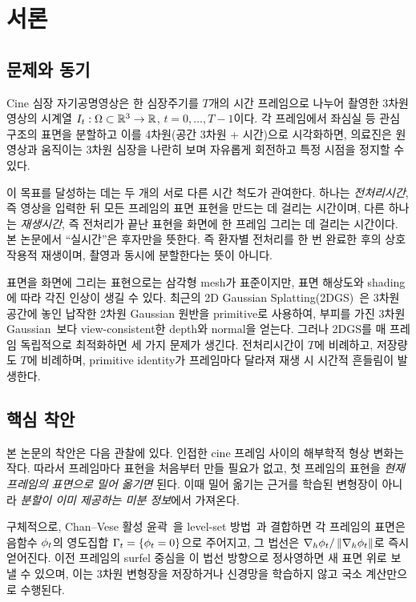 \chapter{서론}
\label{ch:intro}

\section{문제와 동기}

Cine 심장 자기공명영상은 한 심장주기를 $T$개의 시간 프레임으로 나누어 촬영한
3차원 영상의 시계열 $I_t:\Omega\subset\mathbb{R}^3\to\mathbb{R}$, $t=0,\dots,T-1$이다. 각
프레임에서 좌심실 등 관심 구조의 표면을 분할하고 이를 4차원(공간 3차원 + 시간)으로
시각화하면, 의료진은 원 영상과 움직이는 3차원 심장을 나란히 보며 자유롭게 회전하고
특정 시점을 정지할 수 있다.

이 목표를 달성하는 데는 두 개의 서로 다른 시간 척도가 관여한다. 하나는
\emph{전처리시간}, 즉 영상을 입력한 뒤 모든 프레임의 표면 표현을 만드는 데 걸리는
시간이며, 다른 하나는 \emph{재생시간}, 즉 전처리가 끝난 표현을 화면에 한 프레임
그리는 데 걸리는 시간이다. 본 논문에서 ``실시간''은 후자만을 뜻한다. 즉 환자별
전처리를 한 번 완료한 후의 상호작용적 재생이며, 촬영과 동시에 분할한다는 뜻이
아니다.

표면을 화면에 그리는 표현으로는 삼각형 mesh가 표준이지만, 표면 해상도와 shading에
따라 각진 인상이 생길 수 있다. 최근의 2D Gaussian Splatting(2DGS)~\citep{huang2024_2dgs}은
3차원 공간에 놓인 납작한 2차원 Gaussian 원반을 primitive로 사용하여, 부피를 가진
3차원 Gaussian~\citep{kerbl2023_3dgs}보다 view-consistent한 depth와 normal을 얻는다.
그러나 2DGS를 매 프레임 독립적으로 최적화하면 세 가지 문제가 생긴다. 전처리시간이
$T$에 비례하고, 저장량도 $T$에 비례하며, primitive identity가 프레임마다 달라져
재생 시 시간적 흔들림이 발생한다.

\section{핵심 착안}

본 논문의 착안은 다음 관찰에 있다. 인접한 cine 프레임 사이의 해부학적 형상 변화는
작다. 따라서 프레임마다 표현을 처음부터 만들 필요가 없고, 첫 프레임의 표현을
\emph{현재 프레임의 표면으로 밀어 옮기면} 된다. 이때 밀어 옮기는 근거를 학습된
변형장이 아니라 \emph{분할이 이미 제공하는 미분 정보}에서 가져온다.

구체적으로, Chan--Vese 활성 윤곽~\citep{chan2001_active}을 level-set
방법~\citep{osher1988_fronts}과 결합하면 각 프레임의 표면은 음함수 $\phi_t$의
영도집합 $\Gamma_t=\{\phi_t=0\}$으로 주어지고, 그 법선은 $\nabla_h\phi_t/\left\lVert \nabla_h\phi_t \right\rVert$로
즉시 얻어진다. 이전 프레임의 surfel 중심을 이 법선 방향으로 정사영하면 새 표면
위로 보낼 수 있으며, 이는 3차원 변형장을 저장하거나 신경망을 학습하지 않고 국소
계산만으로 수행된다.

